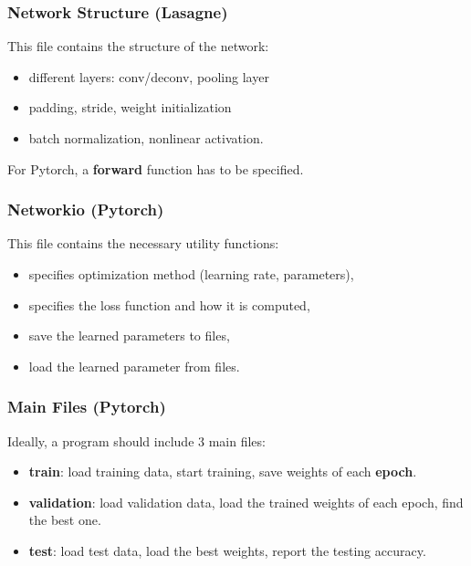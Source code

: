 \documentclass[10pt]{beamer}
\begin{document}
\begin{frame}
\frametitle{Network Structure (Lasagne)}
This file contains the structure of the network: 
\begin{itemize}
	\item different layers: conv/deconv, pooling layer
	\item padding, stride, weight initialization
	\item batch normalization, nonlinear activation.
\end{itemize}
\vskip 0.2in
For Pytorch, a \textbf{forward} function has to be specified.
\end{frame}

\begin{frame}
\frametitle{Networkio (Pytorch)}
This file contains the necessary utility functions:
\begin{itemize}
	\item specifies optimization method (learning rate, parameters),
	\item specifies the loss function and how it is computed,
	\item save the learned parameters to files,
	\item load the learned parameter from files.
\end{itemize}
\end{frame}

\begin{frame}
\frametitle{Main Files (Pytorch)}
Ideally, a program should include 3 main files: 
\begin{itemize}
	\item \textbf{train}: load training data, start training, save weights of each \textbf{epoch}.
	\item \textbf{validation}: load validation data, load the trained weights of each epoch, find the best one.
	\item \textbf{test}: load test data, load the best weights, report the testing accuracy.
\end{itemize}
\end{frame}
\end{document}
